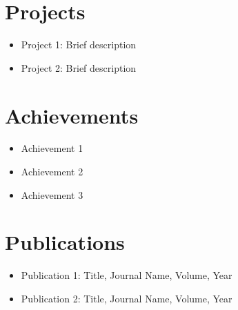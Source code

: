 \documentclass[12pt,a4paper]{article}
\begin{document}
\begin{multicols}{2}[\vskip 1cm]
\section*{Projects} \begin{itemize} \item Project 1: Brief description \item Project 2: Brief description \end{itemize}


\section*{Achievements} 
\begin{itemize} 
\item Achievement 1 
\item Achievement 2 
\item Achievement 3 
\end{itemize}

\section*{Publications} 

\begin{itemize} 
\item Publication 1: Title, Journal Name, Volume, Year 
\item Publication 2: Title, Journal Name, Volume, Year 
\end{itemize}

\end{multicols}

\vfill
\end{document}
